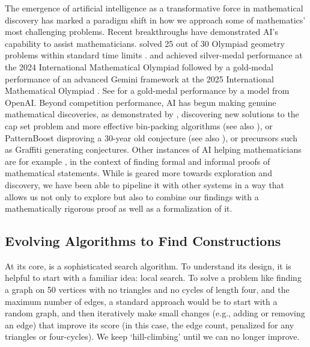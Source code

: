 The emergence of artificial intelligence as a transformative force in mathematical discovery has marked a paradigm shift in how we approach some of mathematics' most challenging problems. Recent breakthroughs \cite{davies2021advancing, he2022murmurations, douglas2022numerical, coolsaet2023house, wang2023asymptotic,alfarano2024global, swirszcz2025advancing,wang2025discovery} have demonstrated AI's capability to assist mathematicians. \AlphaGeometry solved 25 out of 30 Olympiad geometry problems within standard time limits \cite{trinh2024solving}. \AlphaProof and  \cite{deepmind2024alphaproof} achieved silver-medal performance at the 2024 International Mathematical Olympiad followed by a gold-medal performance of an advanced Gemini \DeepThink framework at the 2025 International Mathematical Olympiad \cite{deepmind2025dt}. See \cite{Wei2025} for a gold-medal performance by a model from OpenAI. Beyond competition performance, AI has begun making genuine mathematical discoveries, as demonstrated by \FunSearch \cite{romeraparedes2023mathematical}, discovering new solutions to the cap set problem and more effective bin-packing algorithms (see also \cite{ellenberg2025generative}), or PatternBoost \cite{charton2024patternboost} disproving a 30-year old conjecture (see also \cite{Wagner2021}), or precursors such as Graffiti \cite{fajtlowicz1988conjectures} generating conjectures. Other instances of AI helping mathematicians are for example \cite{collins2024evaluating,thakur2024incontext,yang2023leandojo,yang2024formal}, in the context of finding formal and informal proofs of mathematical statements. While \AlphaEvolve is geared more towards exploration and discovery, we have been able to pipeline it with other systems in a way that allows us not only to explore but also to combine our findings with a mathematically rigorous proof as well as a formalization of it. 

\subsection{Evolving Algorithms to Find Constructions}

At its core, \AlphaEvolve is a sophisticated search algorithm. To understand its design, it is helpful to start with a familiar idea: local search. To solve a problem like finding a graph on 50 vertices with no triangles and no cycles of length four, and the maximum number of edges, a standard approach would be to start with a random graph, and then iteratively make small changes (e.g., adding or removing an edge) that improve its score (in this case, the edge count, penalized for any triangles or four-cycles). We keep `hill-climbing' until we can no longer improve.

